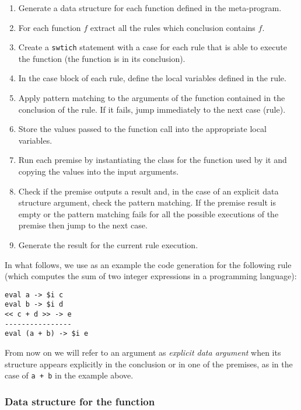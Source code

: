 \begin{enumerate}
	\item Generate a data structure for each function defined in the meta-program.
	\item For each function $f$ extract all the rules which conclusion contains $f$.
	\item Create a \texttt{swtich} statement with a case for each rule that is able to execute the function (the function is in its conclusion).
	\item In the case block of each rule, define the local variables defined in the rule.
	\item Apply pattern matching to the arguments of the function contained in the conclusion of the rule. If it fails, jump immediately to the next case (rule).
	\item Store the values passed to the function call into the appropriate local variables.
	\item Run each premise by instantiating the class for the function used by it and copying the values into the input arguments.
	\item Check if the premise outputs a result and, in the case of an explicit data structure argument, check the pattern matching. If the premise result is empty or the pattern matching fails for all the possible executions of the premise then jump to the next case.
	\item Generate the result for the current rule execution. 
\end{enumerate}

\noindent
In what follows, we use as an example the code generation for the following rule (which computes the sum of two integer expressions in a programming language):

\begin{lstlisting}
eval a -> $i c
eval b -> $i d
<< c + d >> -> e
----------------
eval (a + b) -> $i e
\end{lstlisting}

From now on we will refer to an argument as \textit{explicit data argument} when its structure appears explicitly in the conclusion or in one of the premises, as in the case of \texttt{a + b} in the example above.

\subsubsection{Data structure for the function}
\label{subsubsec:function_generation}

